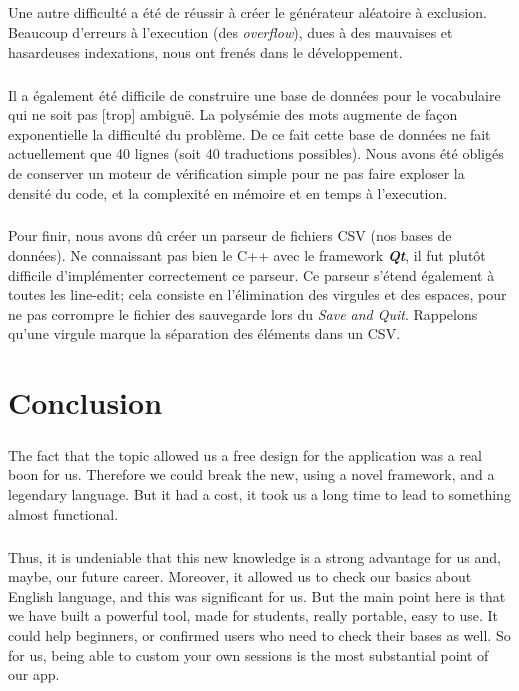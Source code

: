 \documentclass[12pt, a4paper]{report}
\begin{document}
\paragraph{}Une autre difficulté a été de réussir à créer le générateur aléatoire à exclusion. Beaucoup d'erreurs à l'execution (des \textit{overflow}), dues à des mauvaises et hasardeuses indexations, nous ont frenés dans le développement.

\paragraph{}Il a également été difficile de construire une base de données pour le vocabulaire qui ne soit pas [trop] ambiguë. La polysémie des mots augmente de façon exponentielle la difficulté du problème. De ce fait cette base de données ne fait actuellement que 40 lignes (soit 40 traductions possibles). Nous avons été obligés de conserver un moteur de vérification simple pour ne pas faire exploser la densité du code, et la complexité en mémoire et en temps à l'execution.

\paragraph{}Pour finir, nous avons dû créer un parseur de fichiers CSV (nos bases de données). Ne connaissant pas bien le C++ avec le framework \textbf{\textit{Qt}}, il fut plutôt difficile d'implémenter correctement ce parseur. Ce parseur s'étend également à toutes les line-edit; cela consiste en l'élimination des virgules et des espaces, pour ne pas corrompre le fichier des sauvegarde lors du \textit{Save and Quit}. Rappelons qu'une virgule marque la séparation des éléments dans un CSV.

\newpage
\chapter*{Conclusion}

\paragraph{}The fact that the topic allowed us a free design for the application was a real boon for us. Therefore we could break the new, using a novel framework, and a legendary language. But it had a cost, it took us a long time to lead to something almost functional. 

\paragraph{}Thus, it is undeniable that this new knowledge is a strong advantage for us and, maybe, our future career. Moreover, it allowed us to check our basics about English language, and this was significant for us. But the main point here is that we have built a powerful tool, made for students, really portable, easy to use. It could help beginners, or confirmed users who need to check their bases as well. So for us, being able to custom your own sessions is the most substantial point of our app.
\end{document}

